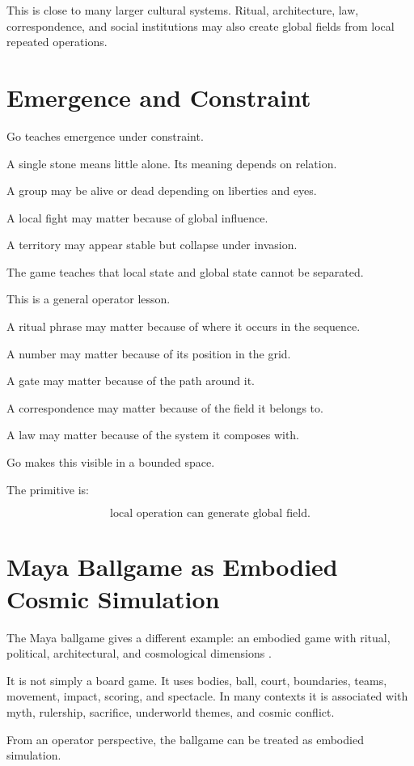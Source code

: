 \documentclass[11pt]{book}
\begin{document}
This is close to many larger cultural systems. Ritual, architecture, law, correspondence, and social institutions may also create global fields from local repeated operations.

\section{Emergence and Constraint}

Go teaches emergence under constraint.

A single stone means little alone. Its meaning depends on relation.

A group may be alive or dead depending on liberties and eyes.

A local fight may matter because of global influence.

A territory may appear stable but collapse under invasion.

The game teaches that local state and global state cannot be separated.

This is a general operator lesson.

A ritual phrase may matter because of where it occurs in the sequence.

A number may matter because of its position in the grid.

A gate may matter because of the path around it.

A correspondence may matter because of the field it belongs to.

A law may matter because of the system it composes with.

Go makes this visible in a bounded space.

The primitive is:

\[
\text{local operation can generate global field}.
\]

\section{Maya Ballgame as Embodied Cosmic Simulation}

The Maya ballgame gives a different example: an embodied game with ritual, political, architectural, and cosmological dimensions \cite{Coe2011Maya}.

It is not simply a board game. It uses bodies, ball, court, boundaries, teams, movement, impact, scoring, and spectacle. In many contexts it is associated with myth, rulership, sacrifice, underworld themes, and cosmic conflict.

From an operator perspective, the ballgame can be treated as embodied simulation.
\end{document}
